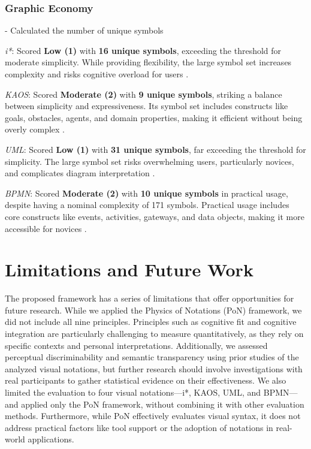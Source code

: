 \documentclass[runningheads]{llncs}
\begin{document}
\subsubsection{Graphic Economy} - Calculated the number of unique symbols 

\textit{i*}: Scored\textbf{ Low (1)} with \textbf{16 unique symbols}, exceeding the threshold for moderate simplicity. While providing flexibility, the large symbol set increases complexity and risks cognitive overload for users \cite{Moody2010}.

\textit{KAOS}: Scored \textbf{Moderate (2)} with \textbf{9 unique symbols}, striking a balance between simplicity and expressiveness. Its symbol set includes constructs like goals, obstacles, agents, and domain properties, making it efficient without being overly complex \cite{Nwokeji2013}.

\textit{UML}: Scored \textbf{Low (1)} with \textbf{31 unique symbols}, far exceeding the threshold for simplicity. The large symbol set risks overwhelming users, particularly novices, and complicates diagram interpretation \cite{Moody2008}.

\textit{BPMN}: Scored \textbf{Moderate (2)} with \textbf{10 unique symbols} in practical usage, despite having a nominal complexity of 171 symbols. Practical usage includes core constructs like events, activities, gateways, and data objects, making it more accessible for novices \cite{Genon2011}.

\section{Limitations and Future Work}

The proposed framework has a series of limitations that offer opportunities for future research. While we applied the Physics of Notations (PoN) framework, we did not include all nine principles. Principles such as cognitive fit and cognitive integration are particularly challenging to measure quantitatively, as they rely on specific contexts and personal interpretations. Additionally, we assessed perceptual discriminability and semantic transparency  using prior studies of the analyzed visual notations, but further research should involve investigations with real participants to gather statistical evidence on their effectiveness. We also limited the evaluation to four visual notations---i*, KAOS, UML, and BPMN---and applied only the PoN framework, without combining it with other evaluation methods. Furthermore, while PoN effectively evaluates visual syntax, it does not address practical factors like tool support or the adoption of notations in real-world applications. 
\end{document}
